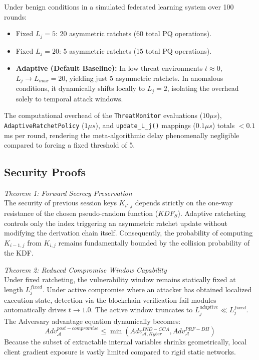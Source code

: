 \documentclass[journal, 10pt, twocolumn]{IEEEtran}
\begin{document}
Under benign conditions in a simulated federated learning system over 100 rounds:
\begin{itemize}
    \item Fixed $L_j = 5$: 20 asymmetric ratchets (60 total PQ operations).
    \item Fixed $L_j = 20$: 5 asymmetric ratchets (15 total PQ operations).
    \item \textbf{Adaptive (Default Baseline):} In low threat environments $t \approx 0$, $L_j \to L_{max} = 20$, yielding just 5 asymmetric ratchets. In anomalous conditions, it dynamically shifts locally to $L_j = 2$, isolating the overhead solely to temporal attack windows.
\end{itemize}

The computational overhead of the \texttt{ThreatMonitor} evaluations ($10 \mu s$), \texttt{AdaptiveRatchetPolicy} ($1 \mu s$), and \texttt{update\_L\_j()} mappings ($0.1 \mu s$) totals $< 0.1$ ms per round, rendering the meta-algorithmic delay phenomenally negligible compared to forcing a fixed threshold of 5.

\subsection{Security Proofs}
\textit{Theorem 1: Forward Secrecy Preservation} \\
The security of previous session keys $K_{i',j}$ depends strictly on the one-way resistance of the chosen pseudo-random function ($KDF_S$). Adaptive ratcheting controls only the index triggering an asymmetric ratchet update without modifying the derivation chain itself. Consequently, the probability of computing $K_{i-1,j}$ from $K_{i,j}$ remains fundamentally bounded by the collision probability of the KDF.

\textit{Theorem 2: Reduced Compromise Window Capability} \\
Under fixed ratcheting, the vulnerability window remains statically fixed at length $L_j^{fixed}$. Under active compromise where an attacker has obtained localized execution state, detection via the blockchain verification fail modules automatically drives $t \to 1.0$. The active window truncates to $L_j^{adaptive} \ll L_j^{fixed}$. The Adversary advantage equation dynamically becomes:
\begin{equation}
Adv_{\mathcal{A}}^{post-compromise} \leq \min \left( Adv_{\mathcal{A},Kyber}^{IND-CCA}, Adv_{\mathcal{A}}^{PRF-DH} \right)
\end{equation}
Because the subset of extractable internal variables shrinks geometrically, local client gradient exposure is vastly limited compared to rigid static networks.
\end{document}
